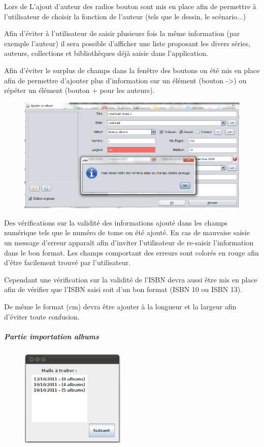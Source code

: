 \documentclass[etudiants]{support-iutrs}
\begin{document}
Lors de L'ajout d'auteur des radios bouton sont mis en place afin de permettre à l'utilisateur de choisir la fonction de l'auteur (tels que le dessin, le scénario...)

Afin d'éviter à l'utilisateur de saisir plusieurs fois la même information (par exemple l'auteur) il sera possible d'afficher une liste proposant les divers séries, auteurs, collections et bibliothèques déjà saisie dans l'application.

Afin d'éviter le surplus de champs dans la fenêtre des boutons on été mis en place afin de permettre d'ajouter plus d'information sur un élément (bouton ->) ou répéter un élément (bouton + pour les auteurs).

\begin{figure}[h!]
\begin{center}
\includegraphics[width=12cm]{img/app_pc_maquette_erreur.png}
\end{center}
\end{figure}

Des vérifications sur la validité des informations ajouté dans les champs numérique tels que le numéro de tome on été ajouté. 
En cas de mauvaise saisie un message d'erreur apparaît afin d'inviter l'utilisateur de re-saisir l'information dans le bon format.
Les champs comportant des erreurs sont colorés en rouge afin d'être facilement trouvé par l'utilisateur. 

Cependant une vérification sur la validité de l'ISBN devra aussi être mis en place afin de vérifier que l'ISBN saisi soit d'un bon format (ISBN 10 ou ISBN 13).

De même le format (cm) devra être ajouter à la longueur et la largeur afin d'éviter toute confusion.    
\clearpage

\subparagraph{Partie importation albums}

\begin{figure}
\includegraphics[width=5cm]{img/import_mail.png}
\end{figure}\subparagraph{}
\end{document}
